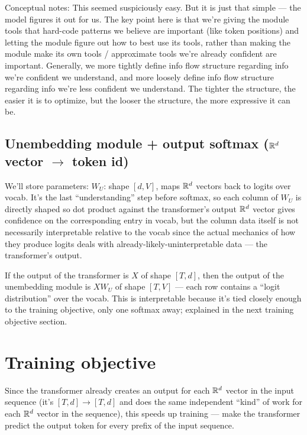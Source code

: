 \documentclass[12pt]{article}
\begin{document}
\begin{outline}
Conceptual notes:
\1 This seemed suspiciously easy. But it is just that simple --- the model figures it out for us. The key point here is that we're giving the module tools that hard-code patterns we believe are important (like token positions) and letting the module figure out how to best use its tools, rather than making the module make its own tools / approximate tools we're already confident are important.
\1 Generally, we more tightly define info flow structure regarding info we're confident we understand, and more loosely define info flow structure regarding info we're less confident we understand. The tighter the structure, the easier it is to optimize, but the looser the structure, the more expressive it can be.
\0

\subsection{Unembedding module + output softmax ($\mathbb{R}^d$ vector $\rightarrow$ token id)}

We'll store parameters:
\1 $W_U$: shape $[d,V]$, maps $\mathbb{R}^d$ vectors back to logits over vocab. It's the last ``understanding'' step before softmax, so each column of $W_U$ is directly shaped so dot product against the transformer's output $\mathbb{R}^d$ vector gives confidence on the corresponding entry in vocab, but the column data itself is not necessarily interpretable relative to the vocab since the actual mechanics of how they produce logits deals with already-likely-uninterpretable data --- the transformer's output.
\\\0

If the output of the transformer is $X$ of shape $[T,d]$, then the output of the unembedding module is $XW_U$ of shape $[T,V]$ --- each row contains a ``logit distribution'' over the vocab. This is interpretable because it's tied closely enough to the training objective, only one softmax away; explained in the next training objective section.

\section{Training objective}

Since the transformer already creates an output for each $\mathbb{R}^d$ vector in the input sequence (it's $[T,d] \rightarrow [T,d]$ and does the same independent ``kind'' of work for each $\mathbb{R}^d$ vector in the sequence), this speeds up training --- make the transformer predict the output token for every prefix of the input sequence. \\


\end{outline}
\end{document}
